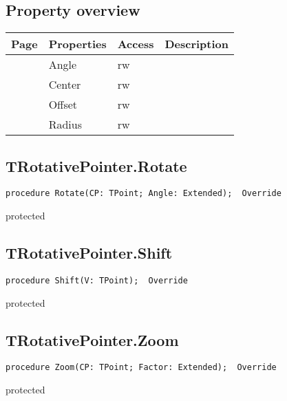\subsection{Property overview}
\label{hmi:drawncontrol:trotativepointer:properties}
\begin{tabularx}{\textwidth}{lllX}
Page & Properties & Access & Description \\ \hline
\pageref{hmi:drawncontrol:trotativepointer:angle} & Angle & rw &  \\
\pageref{hmi:drawncontrol:trotativepointer:center} & Center & rw &  \\
\pageref{hmi:drawncontrol:trotativepointer:offset} & Offset & rw &  \\
\pageref{hmi:drawncontrol:trotativepointer:radius} & Radius & rw &  \\
\hline
\end{tabularx}
\subsection{TRotativePointer.Rotate}
\label{hmi:drawncontrol:trotativepointer:rotate}
\begin{FPCList}
\Declaration 

\begin{verbatim}
procedure Rotate(CP: TPoint; Angle: Extended);  Override
\end{verbatim}
\Visibility
protected
\end{FPCList}
\subsection{TRotativePointer.Shift}
\label{hmi:drawncontrol:trotativepointer:shift}
\begin{FPCList}
\Declaration 

\begin{verbatim}
procedure Shift(V: TPoint);  Override
\end{verbatim}
\Visibility
protected
\end{FPCList}
\subsection{TRotativePointer.Zoom}
\label{hmi:drawncontrol:trotativepointer:zoom}
\begin{FPCList}
\Declaration 

\begin{verbatim}
procedure Zoom(CP: TPoint; Factor: Extended);  Override
\end{verbatim}
\Visibility
protected
\end{FPCList}
